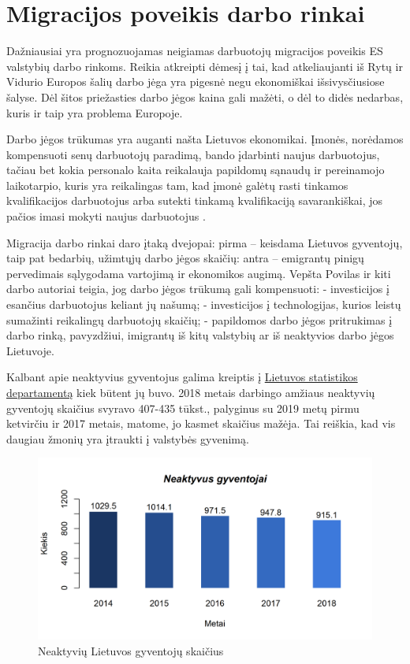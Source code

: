 \documentclass[11pt, titlepage]{article}
\begin{document}
\section{Migracijos poveikis darbo rinkai}

	Dažniausiai yra prognozuojamas neigiamas darbuotojų migracijos poveikis ES valstybių darbo rinkoms. Reikia atkreipti dėmesį į tai, kad atkeliaujanti iš Rytų ir Vidurio Europos šalių darbo jėga yra pigesnė negu ekonomiškai išsivysčiusiose šalyse. Dėl šitos priežasties darbo jėgos kaina gali mažėti, o dėl to didės nedarbas, kuris ir taip yra problema Europoje.
	
	Darbo jėgos trūkumas yra auganti našta Lietuvos ekonomikai. Įmonės, norėdamos kompensuoti senų darbuotojų paradimą, bando įdarbinti naujus darbuotojus, tačiau bet kokia personalo kaita reikalauja papildomų sąnaudų ir pereinamojo laikotarpio, kuris yra reikalingas tam, kad įmonė galėtų rasti tinkamos kvalifikacijos darbuotojus arba sutekti tinkamą kvalifikaciją savarankiškai, jos pačios imasi mokyti naujus darbuotojus \parencite{januvsauskas2009vsiuolaikiniai}.
	
	Migracija darbo rinkai daro įtaką dvejopai: pirma – keisdama Lietuvos gyventojų, taip pat bedarbių, užimtųjų darbo jėgos skaičių: antra – emigrantų pinigų pervedimais sąlygodama vartojimą ir ekonomikos augimą.
Vepšta Povilas ir kiti darbo autoriai teigia, jog darbo jėgos trūkumą gali kompensuoti: 
-	investicijos į esančius darbuotojus keliant jų našumą;
-	investicijos į technologijas, kurios leistų sumažinti reikalingų darbuotojų skaičių;
-	papildomos darbo jėgos pritrukimas į darbo rinką, pavyzdžiui, imigrantų iš kitų valstybių ar iš neaktyvios darbo jėgos Lietuvoje.
	
	Kalbant apie neaktyvius gyventojus galima kreiptis į \href{https://osp.stat.gov.lt/statistiniu-rodikliu-analize#/} {Lietuvos statistikos departamentą} kiek būtent jų buvo. 2018 metais darbingo amžiaus neaktyvių gyventojų skaičius svyravo 407-435 tūkst., palyginus su 2019 metų pirmu ketvirčiu ir 2017 metais, matome, jo kasmet skaičius mažėja. Tai reiškia, kad vis daugiau žmonių yra įtraukti į valstybės gyvenimą.

\begin{figure}[H]
\center
\includegraphics[scale=0.85]{neaktyvus}
\caption{Neaktyvių Lietuvos gyventojų skaičius}
\end{figure}
\end{document}
